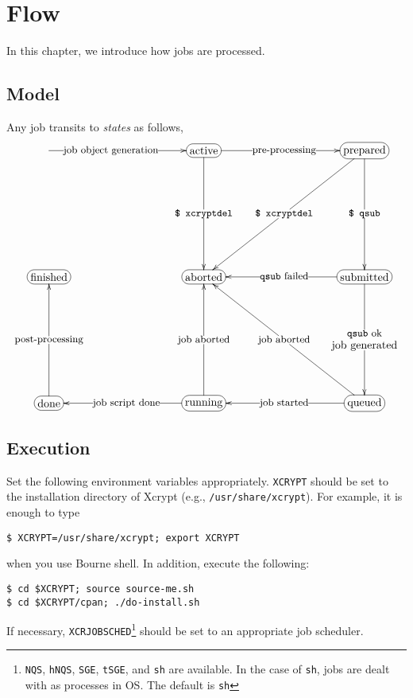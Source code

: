 \documentclass[a4paper,10pt]{report}
\begin{document}
\chapter{Flow}

In this chapter, we introduce how jobs are processed.

\section{Model}\label{sec:states}

Any job transits to \textit{states} as follows,
\[
\entrymodifiers={+[F-:<10pt>]}
\xymatrix@=100pt{
  *{} \ar[r]|(.4){\txt{\small job object generation}} &
  \txt{active} \ar[r]|{\txt{\small pre-processing}} \ar[d]|{\txt{\small \texttt{\$ xcryptdel}}}&
  \txt{prepared} \ar[d]|{\txt{\small \texttt{\$ qsub}}} \ar[ld]|{\txt{\small \texttt{\$ xcryptdel}}}\\
  \txt{finished} &
  \txt{aborted} &
  \txt{submitted} \ar[d]|{\txt{\small \texttt{qsub} ok\\job generated}} \ar[l]|{\txt{\small \texttt{qsub} failed}}\\
  \txt{done} \ar[u]|{\txt{\small post-processing}} &
  \txt{running} \ar[l]|{\txt{\small job script done}} \ar[u]|{\txt{\small job aborted}} &
  \txt{queued} \ar[l]|{\txt{\small job started}} \ar[lu]|{\txt{\small job aborted}}
}
\]

\section{Execution}

Set the following environment variables appropriately.
\texttt{XCRYPT} should be set to the installation directory of Xcrypt
(e.g., \texttt{/usr/share/xcrypt}).
For example, it is enough to type
\begin{screen}
\texttt{\$ XCRYPT=/usr/share/xcrypt; export XCRYPT}
\end{screen}
when you use Bourne shell.  In addition, execute the following:
\begin{screen}
\texttt{\$ cd \$XCRYPT; source source-me.sh}\\
\texttt{\$ cd \$XCRYPT/cpan; ./do-install.sh}
\end{screen}

If necessary, \texttt{XCRJOBSCHED}\footnote{\texttt{NQS},
\texttt{hNQS}, \texttt{SGE}, \texttt{tSGE}, and \texttt{sh} are
available.  In the case of \texttt{sh}, jobs are dealt with as
processes in OS.  The default is \texttt{sh}} should be set to an
appropriate job scheduler.
\end{document}
